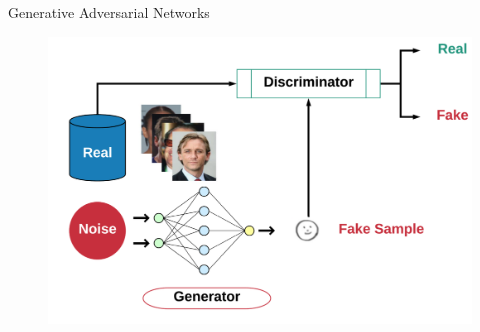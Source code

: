 \documentclass{beamer}
\begin{document}
\begin{frame}{Generative Adversarial Networks}

\begin{center}
  \begin{figure}
\includegraphics[scale=0.35]{_img/gans.png}
\end{figure}\label{fig:gans}
\vskip 1cm
\end{center}

\end{frame}



\end{document}
